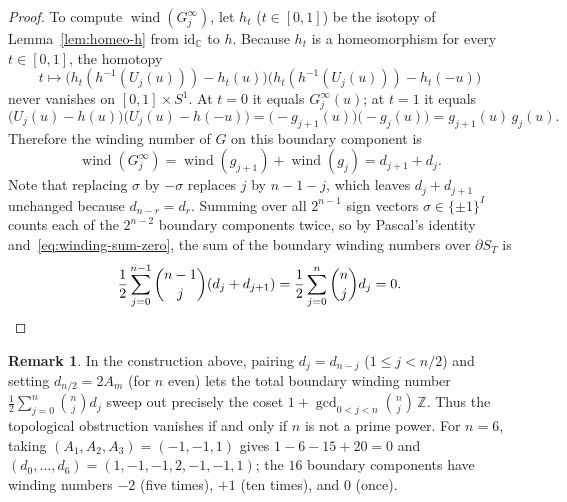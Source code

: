 \documentclass[11pt,a4paper]{amsart}
\numberwithin{equation}{section}
\theoremstyle{definition}
\newtheorem{remark}[theorem]{Remark}
\newcommand{\C}{\mathbb{C}}
\newcommand{\Z}{\mathbb{Z}}
\newcommand{\wind}{\operatorname{wind}}
\begin{document}
\begin{proof}
To compute $\wind(G^\infty_j)$, let $h_t$ ($t \in [0,1]$) be the isotopy of Lemma~\ref{lem:homeo-h} from $\mathrm{id}_\C$ to $h$. Because $h_t$ is a homeomorphism for every $t \in [0,1]$, the homotopy
\[
t \longmapsto \bigl(h_t(h^{-1}(U_j(u))) - h_t(u)\bigr)\bigl(h_t(h^{-1}(U_j(u))) - h_t(-u)\bigr)
\]
never vanishes on $[0,1] \times S^1$. At $t = 0$ it equals $G^\infty_j(u)$; at $t = 1$ it equals
\[
\bigl(U_j(u) - h(u)\bigr)\bigl(U_j(u) - h(-u)\bigr) = \bigl(-g_{j+1}(u)\bigr)\bigl(-g_j(u)\bigr) = g_{j+1}(u)\, g_j(u).
\]
Therefore the winding number of $G$ on this boundary component is
\[
\wind(G^\infty_j) = \wind(g_{j+1}) + \wind(g_j) = d_{j+1} + d_j.
\]
Note that replacing $\sigma$ by $-\sigma$ replaces $j$ by $n-1-j$, which leaves $d_j + d_{j+1}$ unchanged because $d_{n-r} = d_r$. Summing over all $2^{n-1}$ sign vectors $\sigma \in \{\pm 1\}^I$ counts each of the $2^{n-2}$ boundary components twice, so by Pascal's identity and~\eqref{eq:winding-sum-zero}, the sum of the boundary winding numbers over $\partial S_T$ is
\[
\frac{1}{2} \sum_{j=0}^{n-1} \binom{n-1}{j} (d_j + d_{j+1}) = \frac{1}{2} \sum_{j=0}^n \binom{n}{j} d_j = 0. \qedhere
\]
\end{proof}

\begin{remark}
\label{rem:allowed-windings}
In the construction above, pairing $d_j = d_{n-j}$ ($1 \le j < n/2$) and setting $d_{n/2} = 2 A_m$ (for $n$ even) lets the total boundary winding number $\frac{1}{2}\sum_{j=0}^n \binom{n}{j} d_j$ sweep out precisely the coset $1 + \gcd_{0<j<n}\binom{n}{j}\,\Z$. Thus the topological obstruction vanishes if and only if $n$ is not a prime power. For $n = 6$, taking $(A_1, A_2, A_3) = (-1, -1, 1)$ gives $1 - 6 - 15 + 20 = 0$ and $(d_0,\dots,d_6) = (1,-1,-1,2,-1,-1,1)$; the $16$ boundary components have winding numbers $-2$ (five times), $+1$ (ten times), and $0$ (once).
\end{remark}
\end{document}
